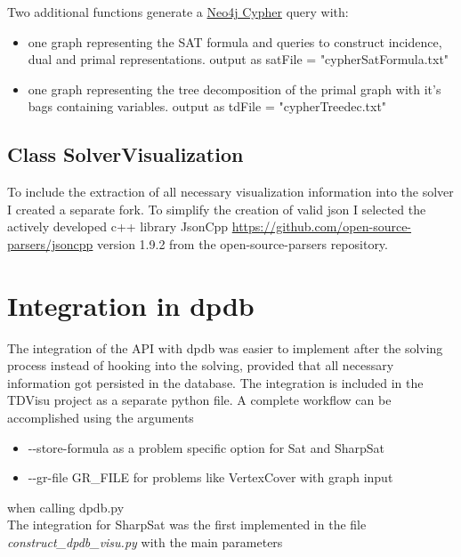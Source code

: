 \documentclass[a4paper, 12pt, bibliography=totoc]{scrartcl}
\begin{document}
Two additional functions generate a \href{https://neo4j.com/docs/cypher-refcard/current/}{Neo4j Cypher} query with:
\begin{itemize}
	\item one graph representing the SAT formula and  queries to construct incidence, dual and primal representations.
	output as satFile = "cypherSatFormula.txt"
	\item one graph representing the tree decomposition of the primal graph with it's bags containing variables.
	output as tdFile = "cypherTreedec.txt"
\end{itemize}

\subsection{Class SolverVisualization}

To include the extraction of all necessary visualization information into the solver I created a separate fork.
To simplify the creation of valid json I selected the actively developed c++ library JsonCpp \url{https://github.com/open-source-parsers/jsoncpp} version 1.9.2 from the open-source-parsers repository.

\newpage
\section{Integration in dpdb}\label{sec:dpdb}
The integration of the API with dpdb was easier to implement after the solving process instead of hooking into the solving, 
provided that all necessary information got persisted in the database.
The integration is included in the TDVisu project as a separate python file.
A complete workflow can be accomplished using the arguments
\begin{itemize}
	\item -{}-store-formula as a problem specific option for Sat and SharpSat
	\item -{}-gr-file GR\_FILE for problems like VertexCover with graph input 
\end{itemize}
when calling dpdb.py\\
The integration for SharpSat was the first implemented in the file \textit{construct\_dpdb\_visu.py} with
the main parameters
\end{document}
